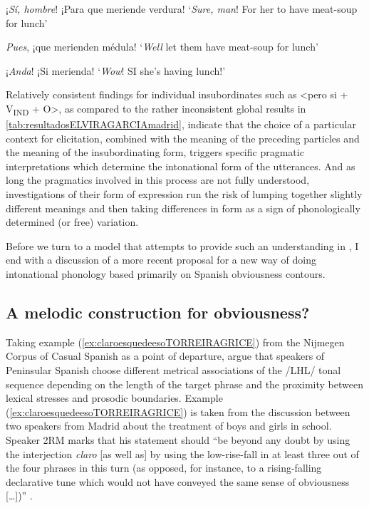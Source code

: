 \begin{exe}
	\label{ex:corpusELVIRAGARCIA}
	\ex ¡\textit{Sí, hombre}! ¡Para que meriende verdura!
	\glt `\textit{Sure, man}! For her to have meat-soup for lunch'
	
	\ex \textit{Pues}, ¡que merienden médula!
	\glt `\textit{Well} let them have meat-soup for lunch'
	
	\ex ¡\textit{Anda}! ¡Si merienda!
	\glt `\textit{Wow}! SI she's having lunch!'
\end{exe}

Relatively consistent findings for individual insubordinates such as <pero si + V\textsubscript{IND} + O>, as compared to the rather inconsistent global results in \autoref{tab:resultadosELVIRAGARCIAmadrid}, indicate that the choice of a particular context for elicitation, combined with the meaning of the preceding particles and the meaning of the insubordinating form, triggers specific pragmatic interpretations which determine the intonational form of the utterances. And as long the pragmatics involved in this process are not fully understood, investigations of their form of expression run the risk of lumping together slightly different meanings and then taking differences in form as a sign of phonologically determined (or free) variation.

Before we turn to a model that attempts to provide such an understanding in , I end  with a discussion of a more recent proposal for a new way of doing intonational phonology based primarily on Spanish obviousness contours.

\subsection{A melodic construction for obviousness?}
\label{ch:2.3.5}

Taking example (\ref{ex:claroesquedeesoTORREIRAGRICE}) from the Nijmegen Corpus of Casual Spanish \citep{TorreiraErnestus.2012} as a point of departure, \citet{TorreiraGrice.2018} argue that speakers of Peninsular Spanish choose different metrical associations of the /LHL/ tonal sequence depending on the length of the target phrase and the proximity between lexical stresses and prosodic boundaries. Example (\ref{ex:claroesquedeesoTORREIRAGRICE}) is taken from the discussion between two speakers from Madrid about the treatment of boys and girls in school. Speaker 2RM marks that his statement should ``be beyond any doubt by using the interjection \textit{claro} [as well as] by using the low-rise-fall in at least three out of the four phrases in this turn (as opposed, for instance, to a rising-falling declarative tune which would not have conveyed the same sense of obviousness [\ldots])'' \citep[16]{TorreiraGrice.2018}.\pagebreak

